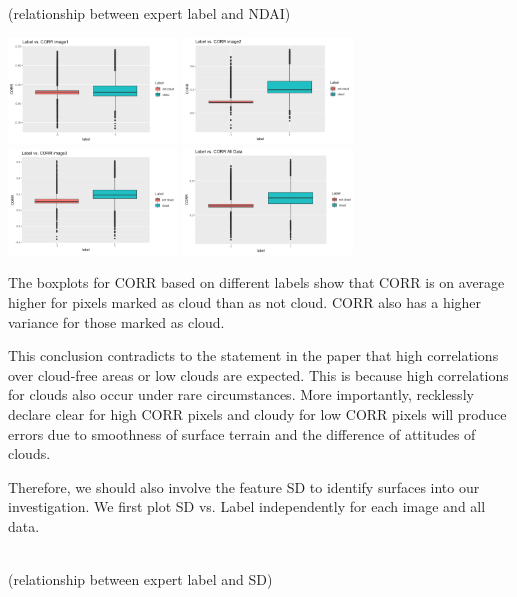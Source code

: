 \documentclass[11pt]{article}
\begin{document}
(relationship between expert label and NDAI)

\includegraphics[width = 4.5cm]{1(c)image4.png}
\includegraphics[width = 4.5cm]{1(c)image5.png}
\includegraphics[width = 4.5cm]{1(c)image6.png}
\includegraphics[width = 4.5cm]{1(c)image7.png}

The boxplots for CORR based on different labels show that CORR is on average higher for pixels marked as cloud than as not cloud. CORR also has a higher variance for those marked as cloud.

This conclusion contradicts to the statement in the paper that high correlations over cloud-free areas or low clouds are expected. This is because high correlations for clouds also occur under rare circumstances. More importantly, recklessly declare clear for high CORR pixels and cloudy for low CORR pixels will produce errors due to smoothness of surface terrain and the difference of attitudes of clouds.

Therefore, we should also involve the feature SD to identify surfaces into our investigation. We first plot SD vs. Label independently for each image and all data.

\mbox{}\\
(relationship between expert label and SD)
\end{document}
